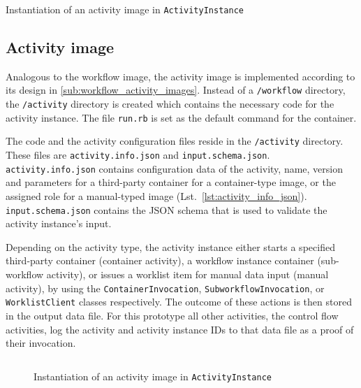     \begin{listing}[htbp]
      \inputminted[firstline=40,lastline=68,fontsize=\footnotesize,linenos=true,numberblanklines=true,showspaces=false,breaklines=true,baselinestretch=1,gobble=2]{ruby}{../code/wf_base/activity_instance.rb}
      \caption[Instantiation of an activity image in ActivityInstance]{Instantiation of an activity image in \texttt{ActivityInstance}}
      \label{lst:instantiation_of_an_activity_image_in_activityinstance}
    \end{listing}


  \subsection{Activity image} %
  \label{sub:activity_containers}
    Analogous to the workflow image, the activity image is implemented according to its design in \ref{sub:workflow_activity_images}. Instead of a \texttt{/workflow} directory, the \texttt{/activity} directory is created which contains the necessary code for the activity instance. The file \texttt{run.rb} is set as the default command for the container.

    The code and the activity configuration files reside in the \texttt{/activity} directory. These files are \texttt{activity.info.json} and \texttt{input.schema.json}. \texttt{activity.info.json} contains configuration data of the activity, \eg name, version and parameters for a third-party container for a container-type image, or the assigned role for a manual-typed image (Lst.~\ref{lst:activity_info_json}). \texttt{input.schema.json} contains the \ac{JSON} schema that is used to validate the activity instance's input.

    Depending on the activity type, the activity instance either starts a specified third-party container (container activity), a workflow instance container (sub-workflow activity), or issues a worklist item for manual data input (manual activity), by using the \texttt{ContainerInvocation}, \texttt{SubworkflowInvocation}, or \texttt{WorklistClient} classes respectively. The outcome of these actions is then stored in the output data file. For this prototype all other activities, \ie the control flow activities, log the activity and activity instance \acp{ID} to that data file as a proof of their invocation.

    \begin{figure}[htbp]
      \inputminted[firstline=18,lastline=27,fontsize=\footnotesize,linenos=true,numberblanklines=true,showspaces=false,breaklines=true,baselinestretch=1,gobble=2]{ruby}{../code/ac_base/run.rb}
      \caption[]{Instantiation of an activity image in \texttt{ActivityInstance}}
      \label{fig:main_logic_of_ac_instance}
    \end{figure}

